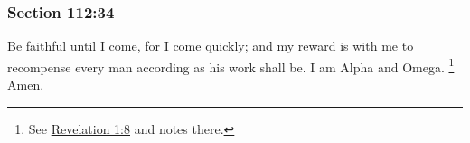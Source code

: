 	\subsubsection{Section 112:34} %
		\label{DC112-34}

		Be faithful until I come, for I come quickly; and my reward is with me to recompense every man according as his work shall be.  I am Alpha and Omega.%
			\footnote{%
				See \hyperref[REVELATIONNT-1-8]{Revelation 1:8} and notes there.
				}
		Amen.

